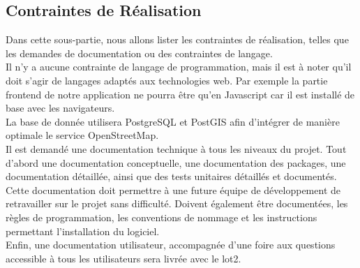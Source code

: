 \subsection{Contraintes de Réalisation}
Dans cette sous-partie, nous allons lister les contraintes de réalisation, telles que les demandes de documentation ou des contraintes de langage.\\

Il n'y a aucune contrainte de langage de programmation, mais il est à noter qu'il doit s'agir de langages adaptés aux technologies web. Par exemple la partie frontend de notre application ne pourra être qu'en Javascript car il est installé de base avec les navigateurs.\\

La base de donnée utilisera PostgreSQL et PostGIS afin d'intégrer de manière optimale le service OpenStreetMap.\\

Il est demandé une documentation technique à tous les niveaux du projet. Tout d'abord une documentation conceptuelle, une documentation des packages, une documentation détaillée, ainsi que des tests unitaires détaillés et documentés. Cette documentation doit permettre à une future équipe de développement de retravailler sur le projet sans difficulté. Doivent également être documentées, les règles de programmation, les conventions de nommage et les instructions permettant l'installation du logiciel.\\

Enfin, une documentation utilisateur, accompagnée d'une foire aux questions accessible à tous les utilisateurs sera livrée avec le lot2.
